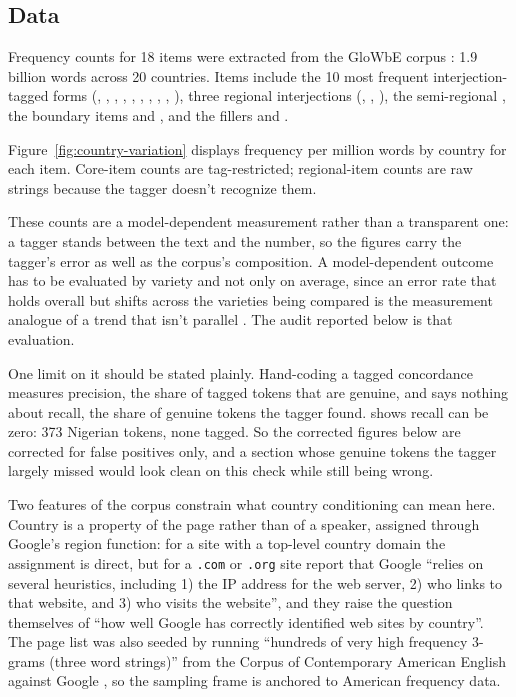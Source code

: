 \documentclass[12pt]{article}
\begin{document}
\subsection{Data}

Frequency counts for 18 items were extracted from the GloWbE corpus
\citep{daviesfuchs2015}: 1.9 billion words across 20 countries. Items
include the 10 most frequent interjection-tagged forms (,
, , , , ,
, , , ), three
regional interjections (, , ),
the semi-regional , the boundary items  and
, and the fillers  and .

Figure~\ref{fig:country-variation} displays frequency per million words by
country for each item. Core-item counts are tag-restricted; regional-item
counts are raw strings because the tagger doesn't recognize them.

These counts are a model-dependent measurement rather than a transparent one:
a tagger stands between the text and the number, so the figures carry the
tagger's error as well as the corpus's composition. A model-dependent outcome
has to be evaluated by variety and not only on average, since an error rate
that holds overall but shifts across the varieties being compared is the
measurement analogue of a trend that isn't parallel
\citep{reynolds2026didcorpus}. The audit reported below is that evaluation.

One limit on it should be stated plainly. Hand-coding a tagged concordance
measures precision, the share of tagged tokens that are genuine, and says
nothing about recall, the share of genuine tokens the tagger found.
 shows recall can be zero: 373 Nigerian tokens, none tagged. So
the corrected figures below are corrected for false positives only, and a
section whose genuine tokens the tagger largely missed would look clean on
this check while still being wrong.

Two features of the corpus constrain what country conditioning can mean here.
Country is a property of the page rather than of a speaker, assigned through
Google's region function: for a site with a top-level country domain the
assignment is direct, but for a \texttt{.com} or \texttt{.org} site
\textcite[4]{daviesfuchs2015} report that Google \enquote{relies on several
heuristics, including 1) the IP address for the web server, 2) who links to
that website, and 3) who visits the website}, and they raise the question
themselves of \enquote{how well Google has correctly identified web sites by
country}. The page list was also seeded by running \enquote{hundreds of very
high frequency 3-grams (three word strings)} from the Corpus of Contemporary
American English against Google \citep[4]{daviesfuchs2015}, so the sampling
frame is anchored to American frequency data.
\end{document}
